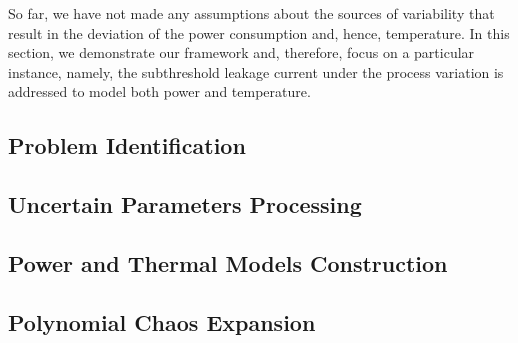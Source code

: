 So far, we have not made any assumptions about the sources of variability that result in the deviation of the power consumption and, hence, temperature. In this section, we demonstrate our framework and, therefore, focus on a particular instance, namely, the subthreshold leakage current under the process variation is addressed to model both power and temperature.

\subsection{Problem Identification} 


\subsection{Uncertain Parameters Processing} 


\subsection{Power and Thermal Models Construction}  


\subsection{Polynomial Chaos Expansion} 

